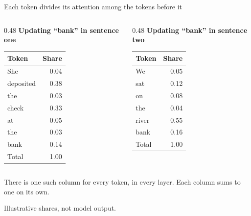 \documentclass[aspectratio=169,11pt]{beamer}
\begin{document}
\begin{frame}{Each token divides its attention among the tokens before it}

\begin{columns}[T]
\begin{column}{0.48\textwidth}
\centering
\textbf{Updating ``bank'' in sentence one}

\vspace{0.15cm}
{\footnotesize
\begin{tabular}{@{}lr@{}}
\toprule
Token & Share \\
\midrule
She & 0.04 \\
\textcolor{mitcardinal}{deposited} & \textcolor{mitcardinal}{0.38} \\
the & 0.03 \\
\textcolor{mitcardinal}{check} & \textcolor{mitcardinal}{0.33} \\
at & 0.05 \\
the & 0.03 \\
bank & 0.14 \\
\midrule
Total & 1.00 \\
\bottomrule
\end{tabular}}
\end{column}
\begin{column}{0.48\textwidth}
\centering
\textbf{Updating ``bank'' in sentence two}

\vspace{0.15cm}
{\footnotesize
\begin{tabular}{@{}lr@{}}
\toprule
Token & Share \\
\midrule
We & 0.05 \\
sat & 0.12 \\
on & 0.08 \\
the & 0.04 \\
\textcolor{mitcardinal}{river} & \textcolor{mitcardinal}{0.55} \\
bank & 0.16 \\
\midrule
Total & 1.00 \\
\bottomrule
\end{tabular}}
\end{column}
\end{columns}

\vspace{0.05cm}

\begin{center}
\alert{There is one such column for every token, in every layer. Each column sums to one on its own.}

\vspace{0.05cm}
{\scriptsize\color{warmgray}Illustrative shares, not model output.}
\end{center}

\end{frame}
\end{document}
